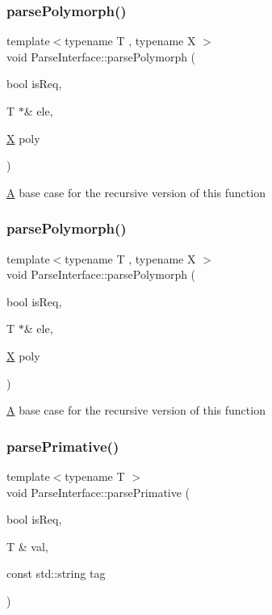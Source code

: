 \subsubsection{\texorpdfstring{parse\+Polymorph()}{parsePolymorph()}\hspace{0.1cm}{\footnotesize\ttfamily [5/6]}}
{\footnotesize\ttfamily template$<$typename T , typename X $>$ \\
void Parse\+Interface\+::parse\+Polymorph (\begin{DoxyParamCaption}\item[{bool}]{is\+Req,  }\item[{T $\ast$\&}]{ele,  }\item[{\hyperlink{classX}{X}}]{poly }\end{DoxyParamCaption})}

\hyperlink{classA}{A} base case for the recursive version of this function \mbox{\label{classParseInterface_a3eddda17bca991a068b171fb6949bce8}} 
\subsubsection{\texorpdfstring{parse\+Polymorph()}{parsePolymorph()}\hspace{0.1cm}{\footnotesize\ttfamily [6/6]}}
{\footnotesize\ttfamily template$<$typename T , typename X $>$ \\
void Parse\+Interface\+::parse\+Polymorph (\begin{DoxyParamCaption}\item[{bool}]{is\+Req,  }\item[{T $\ast$\&}]{ele,  }\item[{\hyperlink{classX}{X}}]{poly }\end{DoxyParamCaption})}

\hyperlink{classA}{A} base case for the recursive version of this function \mbox{\label{classParseInterface_a2ba3a44090e2bebeb485457ea4c743a8}} 
\subsubsection{\texorpdfstring{parse\+Primative()}{parsePrimative()}\hspace{0.1cm}{\footnotesize\ttfamily [1/2]}}
{\footnotesize\ttfamily template$<$typename T $>$ \\
void Parse\+Interface\+::parse\+Primative (\begin{DoxyParamCaption}\item[{bool}]{is\+Req,  }\item[{T \&}]{val,  }\item[{const std\+::string}]{tag }\end{DoxyParamCaption})}

